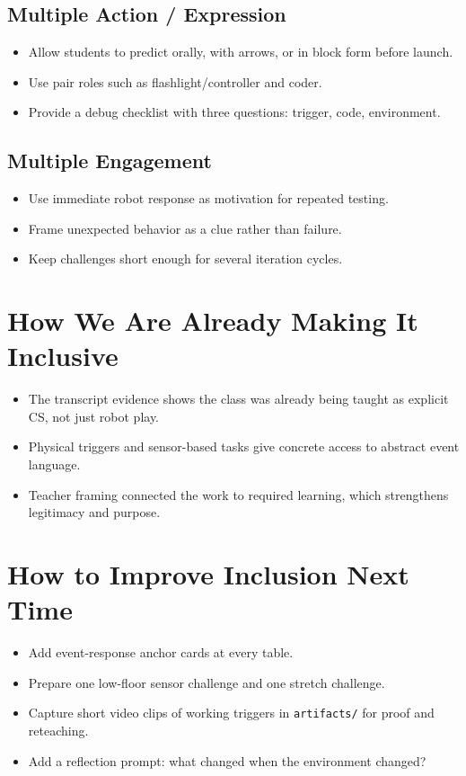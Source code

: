 \documentclass[11pt]{article}
\begin{document}
\subsection*{Multiple Action / Expression}
\begin{itemize}[leftmargin=*]
\item Allow students to predict orally, with arrows, or in block form before launch.
\item Use pair roles such as flashlight/controller and coder.
\item Provide a debug checklist with three questions: trigger, code, environment.
\end{itemize}

\subsection*{Multiple Engagement}
\begin{itemize}[leftmargin=*]
\item Use immediate robot response as motivation for repeated testing.
\item Frame unexpected behavior as a clue rather than failure.
\item Keep challenges short enough for several iteration cycles.
\end{itemize}

\section*{How We Are Already Making It Inclusive}
\begin{itemize}[leftmargin=*]
\item The transcript evidence shows the class was already being taught as explicit CS, not just robot play.
\item Physical triggers and sensor-based tasks give concrete access to abstract event language.
\item Teacher framing connected the work to required learning, which strengthens legitimacy and purpose.
\end{itemize}

\section*{How to Improve Inclusion Next Time}
\begin{itemize}[leftmargin=*]
\item Add event-response anchor cards at every table.
\item Prepare one low-floor sensor challenge and one stretch challenge.
\item Capture short video clips of working triggers in \texttt{artifacts/} for proof and reteaching.
\item Add a reflection prompt: what changed when the environment changed?
\end{itemize}
\end{document}
